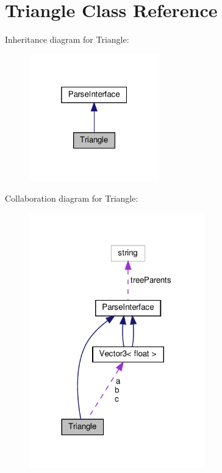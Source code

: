 \hypertarget{classTriangle}{}\section{Triangle Class Reference}
\label{classTriangle}


Inheritance diagram for Triangle\+:
\nopagebreak
\begin{figure}[H]
\begin{center}
\leavevmode
\includegraphics[width=160pt]{classTriangle__inherit__graph}
\end{center}
\end{figure}


Collaboration diagram for Triangle\+:
\nopagebreak
\begin{figure}[H]
\begin{center}
\leavevmode
\includegraphics[width=216pt]{classTriangle__coll__graph}
\end{center}
\end{figure}
